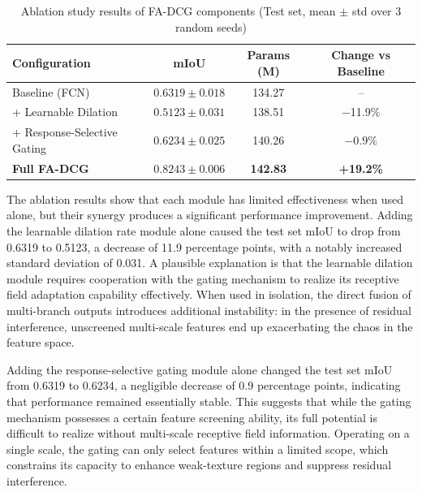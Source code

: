 \documentclass[lettersize,journal]{IEEEtran}
\begin{document}
\begin{table}[htbp]
\centering
\caption{Ablation study results of FA-DCG components (Test set, mean $\pm$ std over 3 random seeds)}
\label{tab:ablation}
\begin{tabular}{lccc}
\toprule
Configuration & mIoU & Params (M) & Change vs Baseline \\
\midrule
Baseline (FCN) & $0.6319 \pm 0.018$ & 134.27 & -- \\
+ Learnable Dilation & $0.5123 \pm 0.031$ & 138.51 & $-$11.9\% \\
+ Response-Selective Gating & $0.6234 \pm 0.025$ & 140.26 & $-$0.9\% \\
\textbf{Full FA-DCG} & $\mathbf{0.8243 \pm 0.006}$ & \textbf{142.83} & \textbf{+19.2\%} \\
\bottomrule
\end{tabular}
\end{table}

The ablation results show that each module has limited effectiveness when used alone, but their synergy produces a significant performance improvement. Adding the learnable dilation rate module alone caused the test set mIoU to drop from 0.6319 to 0.5123, a decrease of 11.9 percentage points, with a notably increased standard deviation of 0.031. A plausible explanation is that the learnable dilation module requires cooperation with the gating mechanism to realize its receptive field adaptation capability effectively. When used in isolation, the direct fusion of multi-branch outputs introduces additional instability: in the presence of residual interference, unscreened multi-scale features end up exacerbating the chaos in the feature space.

Adding the response-selective gating module alone changed the test set mIoU from 0.6319 to 0.6234, a negligible decrease of 0.9 percentage points, indicating that performance remained essentially stable. This suggests that while the gating mechanism possesses a certain feature screening ability, its full potential is difficult to realize without multi-scale receptive field information. Operating on a single scale, the gating can only select features within a limited scope, which constrains its capacity to enhance weak-texture regions and suppress residual interference.
\end{document}
